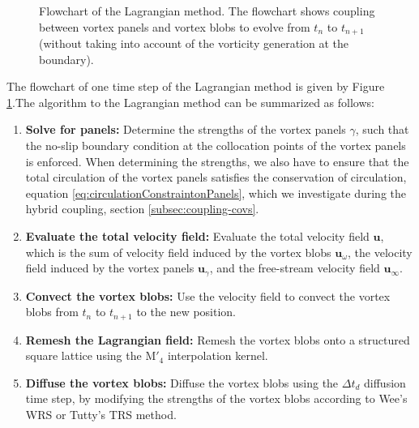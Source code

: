 
	\begin{figure}[!h]
		\centering
		\caption{Flowchart of the Lagrangian method. The flowchart shows coupling between vortex panels and vortex blobs to evolve from $t_n$ to $t_{n+1}$ (without taking into account of the vorticity generation at the boundary).}
		\label{fig:flowchart_lagrangian}
	\end{figure}	
	
The flowchart of one time step of the Lagrangian method is given by Figure \ref{fig:flowchart_lagrangian}.The algorithm to the Lagrangian method can be summarized as follows:
	\begin{enumerate}
	\item \textbf{Solve for panels:} Determine the strengths of the vortex panels $\gamma$, such that the no-slip boundary condition at the collocation points of the vortex panels is enforced. When determining the strengths, we also have to ensure that the total circulation of the vortex panels satisfies the conservation of circulation, equation \ref{eq:circulationConstraintonPanels}, which we investigate during the hybrid coupling, section \ref{subsec:coupling-covs}.
	
	\item \textbf{Evaluate the total velocity field:} Evaluate the total velocity field $\mathbf{u}$, which is the sum of velocity field induced by the vortex blobs $\mathbf{u}_{\omega}$, the velocity field induced by the vortex panels $\mathbf{u}_{\gamma}$, and the free-stream velocity field $\mathbf{u}_{\infty}$. 
	\item \textbf{Convect the vortex blobs:} Use the velocity field to convect the vortex blobs from $t_n$ to $t_{n+1}$ to the new position.
	\item \textbf{Remesh the Lagrangian field:} Remesh the vortex blobs onto a structured square lattice using the $\mathrm{M}'_4$ interpolation kernel.
	\item \textbf{Diffuse the vortex blobs:} Diffuse the vortex blobs using the $\Delta t_d$ diffusion time step, by modifying the strengths of the vortex blobs according to Wee's WRS or Tutty's TRS method.
	\end{enumerate}

